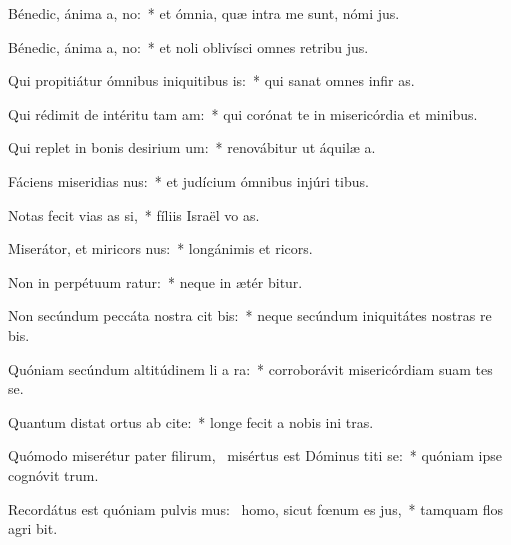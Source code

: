 \item Bénedic, ánima a, no:~* et ómnia, quæ intra me sunt, nómi  jus.
\item Bénedic, ánima a, no:~* et noli oblivísci omnes retribu jus.
\item Qui propitiátur ómnibus iniquitibus is:~* qui sanat omnes infir as.
\item Qui rédimit de intéritu tam am:~* qui corónat te in misericórdia et minibus.
\item Qui replet in bonis desirium um:~* renovábitur ut áquilæ  a.
\item Fáciens miseridias nus:~* et judícium ómnibus injúri tibus.
\item Notas fecit vias as si,~* fíliis Israël vo as.
\item Miserátor, et miricors nus:~* longánimis et  ricors.
\item Non in perpétuum ratur:~* neque in ætér bitur.
\item Non secúndum peccáta nostra cit bis:~* neque secúndum iniquitátes nostras re bis.
\item Quóniam secúndum altitúdinem li a ra:~* corroborávit misericórdiam suam  tes se.
\item Quantum distat ortus ab cite:~* longe fecit a nobis ini tras.
\item Quómodo miserétur pater filirum,~\pscross{} misértus est Dóminus titi se:~* quóniam ipse cognóvit  trum.
\item Recordátus est quóniam pulvis mus:~\pscross{} homo, sicut fœnum es jus,~* tamquam flos agri  bit.
